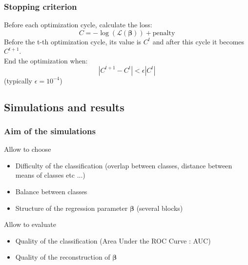 \documentclass{beamer}
\begin{document}
\begin{frame}
    \frametitle{Stopping criterion}
    Before each optimization cycle, calculate the loss:
    $$C= - \log(\mathcal{L}(\bm{\beta})) + \text{penalty}$$
    Before the t-th optimization cycle, its value is $C^{t}$ and after this cycle it becomes $C^{t + 1}$.\\[5 pt]
    End the optimization when:
    $$ |C^{t + 1} - C^t| < \epsilon |C^t|$$
    (typically $\epsilon = 10^{-4}$)
\end{frame}




\begin{frame}
    \section{Simulations and results}    
\end{frame}

\begin{frame}
    \frametitle{Aim of the simulations}
    Allow to choose 
    \begin{itemize}
        \item Difficulty of the classification (overlap between classes, distance between means of classes etc ...)\\[6 pt]
        \item Balance between classes\\[6 pt]
        \item Structure of the regression parameter $\bm{\beta}$ (several blocks)\\[12 pt] 
    \end{itemize}
    Allow to evaluate
    \begin{itemize}
    \item Quality of the classification (Area Under the ROC Curve : AUC)\\[6 pt]
    \item Quality of the reconstruction of $\bm{\beta}$ \nocite{picto}
    \end{itemize}
\end{frame}
\end{document}
